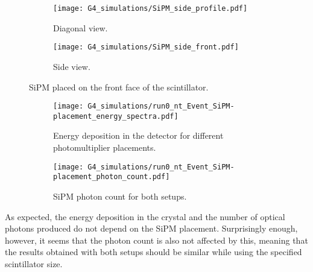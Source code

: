 \begin{figure}[H]
  \centering
  \begin{subfigure}[t]{0.48\textwidth}
    \texttt{[image: G4\_simulations/SiPM\_side\_profile.pdf]}
    \caption{\label{sfig:SiPM_side_profile}Diagonal view.}
  \end{subfigure}
  \hfill
  \begin{subfigure}[t]{0.48\textwidth}
    \texttt{[image: G4\_simulations/SiPM\_side\_front.pdf]}
    \caption{\label{sfig:SiPM_side_front}Side view.}
  \end{subfigure}
  \caption{\label{fig:SiPM_side}SiPM placed on the front face of the scintillator.}
\end{figure}

\begin{figure}[H]
    \centering
    \begin{subfigure}[t]{0.48\textwidth}
      \texttt{[image: G4\_simulations/run0\_nt\_Event\_SiPM-placement\_energy\_spectra.pdf]}
      \caption{\label{sfig:SiPM_place_edep}Energy deposition in the detector for different photomultiplier placements.}
    \end{subfigure}
    \hfill
    \begin{subfigure}[t]{0.48\textwidth}
      \texttt{[image: G4\_simulations/run0\_nt\_Event\_SiPM-placement\_photon\_count.pdf]}
      \caption{\label{sfig:SiPM_place_pcount}SiPM photon count for both setups.}
    \end{subfigure}
    \caption{\label{fig:SiPM_place_results}}
\end{figure}

As expected, the energy deposition in the crystal and the number of optical photons produced do not depend on the SiPM placement. Surprisingly enough, however, it seems that the photon count is also not affected by this, meaning that the results obtained with both setups should be similar while using the specified scintillator size.



